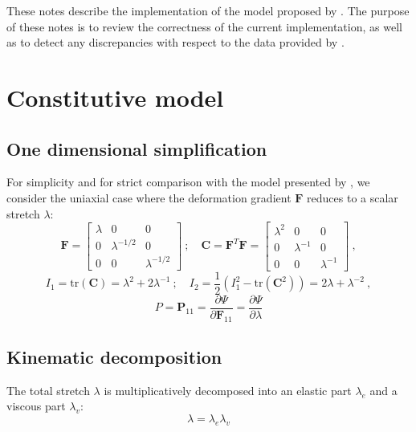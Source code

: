 \documentclass[a4paper,12pt]{article}
\newcommand{\pder}[2]{\frac{\partial #1}{\partial #2}}
\newcommand{\C}{\mathbf{C}}
\newcommand{\F}{\mathbf{F}}
\renewcommand{\P}{\mathbf{P}}  %
\newcommand{\0}{\mathbf{0}}
\begin{document}
These notes describe the implementation of the model proposed by \cite{mokarram2020}. The purpose of these notes is to review the correctness of the current implementation, as well as to detect any discrepancies with respect to the data provided by \cite{mokarram2020}.


\section{Constitutive model}


\subsection{One dimensional simplification}

For simplicity and for strict comparison with the model presented by \cite{mokarram2020}, we consider the uniaxial case where the deformation gradient $\F$ reduces to a scalar stretch $\lambda$:
\begin{equation}
    \F = \begin{bmatrix}
        \lambda & 0 & 0 \\
        0 & \lambda^{-1/2} & 0 \\
        0 & 0 & \lambda^{-1/2}
    \end{bmatrix} \ ; \quad
    \C = \F^T \F = \begin{bmatrix}
        \lambda^2 & 0 & 0 \\
        0 & \lambda^{-1} & 0 \\
        0 & 0 & \lambda^{-1}
    \end{bmatrix} \ ,
\end{equation}
\begin{equation}
    I_1 = \text{tr}(\C) = \lambda^2 + 2\lambda^{-1} \ ; \quad
    I_2 = \frac{1}{2} \left( I_1^2 - \text{tr}(\C^2) \right) = 2\lambda + \lambda^{-2} \ ,
\end{equation}
\begin{equation}
    P = \P_{11} = \pder{\Psi}{\F_{11}} = \pder{\Psi}{\lambda}
\end{equation}



\subsection{Kinematic decomposition}
The total stretch $\lambda$ is multiplicatively decomposed into an elastic part $\lambda_e$ and a viscous part $\lambda_v$:
\begin{equation}
    \lambda = \lambda_e \lambda_v
\end{equation}
\end{document}
